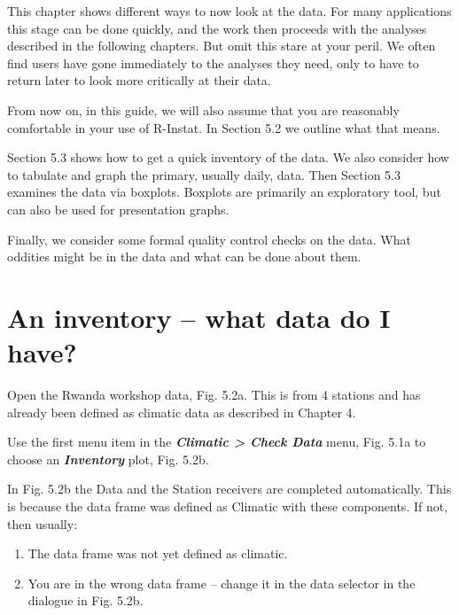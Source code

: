 \documentclass[
  letterpaper,
  DIV=11,
  numbers=noendperiod]{scrreprt}
\begin{document}
This chapter shows different ways to now look at the data. For many
applications this stage can be done quickly, and the work then proceeds
with the analyses described in the following chapters. But omit this
stare at your peril. We often find users have gone immediately to the
analyses they need, only to have to return later to look more critically
at their data.

From now on, in this guide, we will also assume that you are reasonably
comfortable in your use of R-Instat. In Section 5.2 we outline what that
means.

Section 5.3 shows how to get a quick inventory of the data. We also
consider how to tabulate and graph the primary, usually daily, data.
Then Section 5.3 examines the data via boxplots. Boxplots are primarily
an exploratory tool, but can also be used for presentation graphs.

Finally, we consider some formal quality control checks on the data.
What oddities might be in the data and what can be done about them.

\section{An inventory -- what data do I
have?}\label{an-inventory-what-data-do-i-have}

Open the Rwanda workshop data, Fig. 5.2a. This is from 4 stations and
has already been defined as climatic data as described in Chapter 4.

Use the first menu item in the \textbf{\emph{Climatic \textgreater{}
Check Data}} menu, Fig. 5.1a to choose an \textbf{\emph{Inventory}}
plot, Fig. 5.2b.

In Fig. 5.2b the Data and the Station receivers are completed
automatically. This is because the data frame was defined as Climatic
with these components. If not, then usually:

\begin{enumerate}
\def\labelenumi{\alph{enumi}.}
\item
  The data frame was not yet defined as climatic.
\item
  You are in the wrong data frame -- change it in the data selector in
  the dialogue in Fig. 5.2b.
\end{enumerate}
\end{document}
